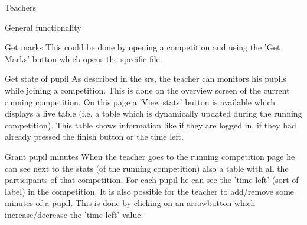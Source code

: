 \begin{section}{Teachers}
\begin{subsection}{General functionality}
\begin{subsubsection}{Get marks}
	This could be done by opening a competition and using the 'Get Marks' button which opens the specific file.
	\end{subsubsection}
	\begin{subsubsection}{Get state of pupil}
	As described in the srs, the teacher can monitors his pupils while joining a competition. This is done on the overview screen of 		the current running competition. On this page a 'View stats' button is available which displays a live table 
	(i.e. a table which is dynamically updated during the running competition). This table shows information like if they are logged 		in, if they had already pressed the finish button or the time left. 
	\end{subsubsection}
	\begin{subsubsection}{Grant pupil minutes}
	When the teacher goes to the running competition page he can see next to the stats (of the running competition) also a table with 		all the participants of that competition. For each pupil he can see the 'time left' (sort of label) in the competition. It is also 		possible for the teacher to add/remove some minutes of a pupil. This is done by clicking on an arrowbutton which increase/decrease 		the 'time left' value.
    \end{subsubsection}
    \end{subsection}

\end{section}
